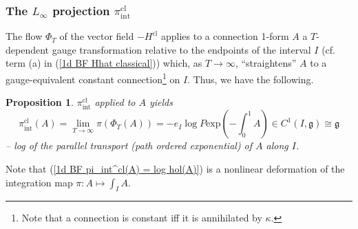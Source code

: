 \documentclass{amsart}
\theoremstyle{plain} %
\newtheorem{prop}[thm]{Proposition}
\theoremstyle{definition}
\theoremstyle{remark}
\newcommand{\g}{\mathfrak{g}}
\newcommand{\mr}{\mathrm}
\newcommand{\ra}{\rightarrow}
\newcommand{\ii}{\mathrm{int}}
\newcommand{\cl}{\mathrm{cl}}
\begin{document}
\subsubsection{The $L_\infty$ projection $\pi_\ii^\cl$} 
The flow $\Phi_T$ of the vector field $-H^\cl$ applies to a connection 1-form $A$ a $T$-dependent gauge transformation relative to the endpoints of the interval $I$ (cf. term (a) in (\ref{1d BF Hhat classical})) which, as $T\ra\infty$, ``straightens'' $A$ to a gauge-equivalent constant connection\footnote{Note that a connection is constant iff it is annihilated by $\kappa$. 
} 
on $I$. Thus, we have the following. 
\begin{prop}
$\pi^\cl_\ii$ applied to $A$ yields
\begin{equation}\label{1d BF pi_int^cl(A) = log hol(A)}
    \pi_\ii^\cl(A)=\lim_{T\ra\infty} \pi(\Phi_T(A)) = -e_I\log 
    P\mr{exp}\left(-\int_0^1 A \right)
    \in C^1(I,\g)\cong \g
\end{equation}
-- log of the parallel transport (path ordered exponential) of $A$ along $I$. 
\end{prop}
Note that (\ref{1d BF pi_int^cl(A) = log hol(A)}) is a nonlinear deformation of the integration map $\pi \colon A\mapsto \int_I A$.
\end{document}
